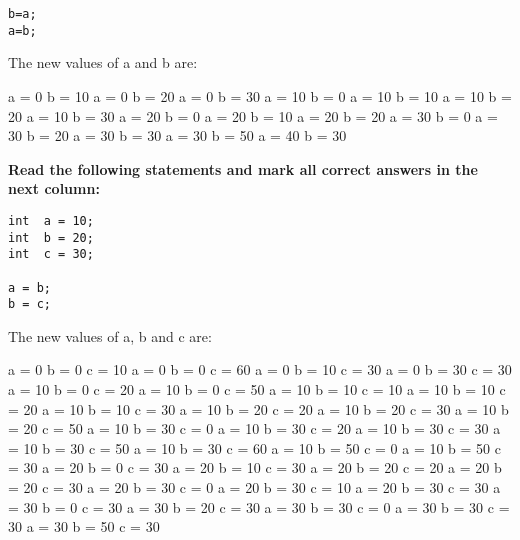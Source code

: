 \documentclass[10pt]{exam}
\begin{document}
\begin{questions}
\begin{minipage}[t][][t]{0.18\textwidth}
\begin{lstlisting}
b=a;
a=b;
  \end{lstlisting}
\end{minipage}
  \hfill
\begin{minipage}[t][][t]{0.75\textwidth}
  The new values of a and b are:
  \begin{multicols*}{3}
\begin{checkboxes}
    \choice a = 0 b = 10
    \choice a = 0 b = 20
    \choice a = 0 b = 30
    \choice a = 10 b = 0
    \choice a = 10 b = 10
    \choice a = 10 b = 20
    \choice a = 10 b = 30
    \choice a = 20 b = 0
    \choice a = 20 b = 10
    \choice a = 20 b = 20
    \choice a = 30 b = 0
    \choice a = 30 b = 20
    \choice a = 30 b = 30
    \choice a = 30 b = 50
    \choice a = 40 b = 30
  \end{checkboxes}
\end{multicols*}
\end{minipage}

\vspace{1cm}  \begin{minipage}[t][][t]{0.18\textwidth}
\question \bf Read the following statements and mark all correct answers in the next column: \raggedright
  \begin{lstlisting}
int  a = 10;
int  b = 20;
int  c = 30;

a = b;
b = c;    
  \end{lstlisting}
\end{minipage}
  \hfill
\begin{minipage}[t][][t]{0.75\textwidth}
  The new values of a, b and c are:
  \begin{multicols*}{3}
\begin{checkboxes}
    \choice a = 0 b = 0 c = 10
    \choice a = 0 b = 0 c = 60
    \choice a = 0 b = 10 c = 30
    \choice a = 0 b = 30 c = 30
    \choice a = 10 b = 0 c = 20
    \choice a = 10 b = 0 c = 50
    \choice a = 10 b = 10 c = 10
    \choice a = 10 b = 10 c = 20
    \choice a = 10 b = 10 c = 30
    \choice a = 10 b = 20 c = 20
    \choice a = 10 b = 20 c = 30
    \choice a = 10 b = 20 c = 50
    \choice a = 10 b = 30 c = 0
    \choice a = 10 b = 30 c = 20
    \choice a = 10 b = 30 c = 30
    \choice a = 10 b = 30 c = 50
    \choice a = 10 b = 30 c = 60
    \choice a = 10 b = 50 c = 0
    \choice a = 10 b = 50 c = 30
    \choice a = 20 b = 0 c = 30
    \choice a = 20 b = 10 c = 30
    \choice a = 20 b = 20 c = 20
    \choice a = 20 b = 20 c = 30
    \choice a = 20 b = 30 c = 0
    \choice a = 20 b = 30 c = 10
    \choice a = 20 b = 30 c = 30
    \choice a = 30 b = 0 c = 30
    \choice a = 30 b = 20 c = 30
    \choice a = 30 b = 30 c = 0
    \choice a = 30 b = 30 c = 30
    \choice a = 30 b = 50 c = 30
  \end{checkboxes}
\end{multicols*}
\end{minipage}


\end{questions}
\end{document}
